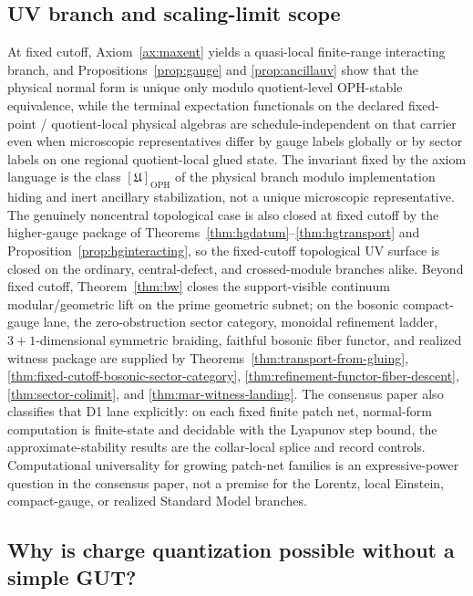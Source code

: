 \documentclass[11pt]{article}
\begin{document}
\subsection{UV branch and scaling-limit scope}

At fixed cutoff, Axiom~\ref{ax:maxent} yields a quasi-local finite-range interacting branch, and Propositions~\ref{prop:gauge} and \ref{prop:ancillauv} show that the physical normal form is unique only modulo quotient-level OPH-stable equivalence, while the terminal expectation functionals on the declared fixed-point / quotient-local physical algebras are schedule-independent on that carrier even when microscopic representatives differ by gauge labels globally or by sector labels on one regional quotient-local glued state. The invariant fixed by the axiom language is the class \([\mathfrak U]_{\mathrm{OPH}}\) of the physical branch modulo implementation hiding and inert ancillary stabilization, not a unique microscopic representative. The genuinely noncentral topological case is also closed at fixed cutoff by the higher-gauge package of Theorems~\ref{thm:hgdatum}--\ref{thm:hgtransport} and Proposition~\ref{prop:hginteracting}, so the fixed-cutoff topological UV surface is closed on the ordinary, central-defect, and crossed-module branches alike. Beyond fixed cutoff, Theorem~\ref{thm:bw} closes the support-visible continuum modular/geometric lift on the prime geometric subnet; on the bosonic compact-gauge lane, the zero-obstruction sector category, monoidal refinement ladder, \(3+1\)-dimensional symmetric braiding, faithful bosonic fiber functor, and realized witness package are supplied by Theorems~\ref{thm:transport-from-gluing}, \ref{thm:fixed-cutoff-bosonic-sector-category}, \ref{thm:refinement-functor-fiber-descent}, \ref{thm:sector-colimit}, and \ref{thm:mar-witness-landing}.
The consensus paper also classifies that D1 lane explicitly: on each fixed finite patch net,
normal-form computation is finite-state and decidable with the Lyapunov step bound, the
approximate-stability results are the collar-local splice and record controls. Computational
universality for growing patch-net families is an expressive-power question in the consensus paper,
not a premise for the Lorentz, local Einstein, compact-gauge, or realized Standard Model branches.

\subsection{Why is charge quantization possible without a simple GUT?}
\end{document}
